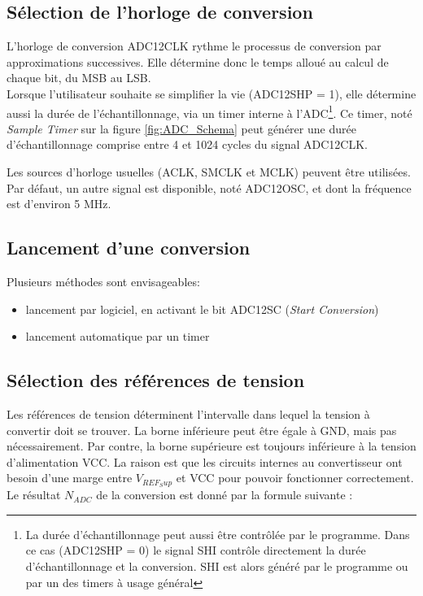 \subsection{Sélection de l'horloge de conversion}
L'horloge de conversion ADC12CLK rythme le processus de conversion par approximations successives. Elle détermine donc le temps alloué au calcul de chaque bit, du MSB au LSB.\\

Lorsque l'utilisateur souhaite se simplifier la vie (ADC12SHP = 1), elle détermine aussi la durée de l'échantillonnage, via un timer interne à l'ADC\footnote{La durée d'échantillonnage peut aussi être contrôlée par le programme. Dans ce cas (ADC12SHP = 0) le signal SHI contrôle directement la durée d'échantillonnage et la conversion. SHI est alors généré par le programme ou par un des timers à usage général}. Ce timer, noté \textit{Sample Timer}  sur la figure \ref{fig:ADC_Schema} peut générer une durée d'échantillonnage comprise entre 4 et 1024 cycles du signal ADC12CLK.

Les sources d'horloge usuelles (ACLK, SMCLK et MCLK) peuvent être utilisées. Par défaut, un autre signal est disponible, noté ADC12OSC, et dont la fréquence est d'environ 5 MHz.

\subsection{Lancement d'une conversion}
Plusieurs méthodes sont envisageables:
\begin{itemize}[label=\textbullet,font=\small]
\item lancement par logiciel, en activant le bit ADC12SC (\textit{Start Conversion})
\item lancement automatique par un timer
\end{itemize}

\subsection{Sélection des références de tension}
Les références de tension déterminent l'intervalle dans lequel la tension à convertir doit se trouver. La borne inférieure peut être égale à GND, mais pas nécessairement. Par contre, la borne supérieure est toujours inférieure à la tension d'alimentation VCC. La raison est que les circuits internes au convertisseur ont besoin d'une marge entre $V_{REF_Sup}$ et VCC pour pouvoir fonctionner correctement.
Le résultat $N_{ADC}$ de la conversion est donné par la formule suivante :


